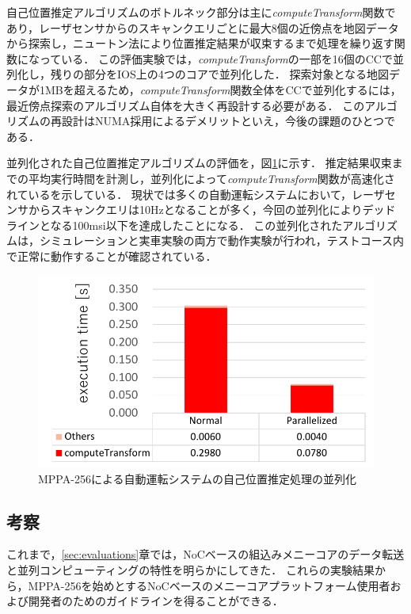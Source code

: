 \documentclass[submit,techrep]{ipsj_v2/UTF8/ipsj}
\begin{document}
自己位置推定アルゴリズムのボトルネック部分は主に\emph{computeTransform}関数であり，レーザセンサからのスキャンクエリごとに最大8個の近傍点を地図データから探索し，ニュートン法により位置推定結果が収束するまで処理を繰り返す関数になっている．
この評価実験では，\emph{computeTransform}の一部を16個のCCで並列化し，残りの部分をIOS上の4つのコアで並列化した．
探索対象となる地図データが1MBを超えるため，\emph{computeTransform}関数全体をCCで並列化するには，最近傍点探索のアルゴリズム自体を大きく再設計する必要がある．
このアルゴリズムの再設計はNUMA採用によるデメリットといえ，今後の課題のひとつである．

並列化された自己位置推定アルゴリズムの評価を，図\ref{fig:ndt_matching}に示す．
推定結果収束までの平均実行時間を計測し，並列化によって\emph{computeTransform}関数が高速化されているを示している．
現状では多くの自動運転システムにおいて，レーザセンサからスキャンクエリは10Hzとなることが多く，今回の並列化によりデッドラインとなる100msi以下を達成したことになる．
この並列化されたアルゴリズムは，シミュレーションと実車実験の両方で動作実験が行われ，テストコース内で正常に動作することが確認されている．

\begin{figure}[t]
  \centering
  \includegraphics[width=0.9\linewidth]{../figure/BarGraph_ndt_matching.pdf}
  \caption{\label{fig:ndt_matching}
  MPPA-256による自動運転システムの自己位置推定処理の並列化}
\end{figure}


\subsection{考察}
\label{sec:lessons}
これまで，\ref{sec:evaluations}章では，NoCベースの組込みメニーコアのデータ転送と並列コンピューティングの特性を明らかにしてきた．
これらの実験結果から，MPPA-256を始めとするNoCベースのメニーコアプラットフォーム使用者および開発者のためのガイドラインを得ることができる．
\end{document}
